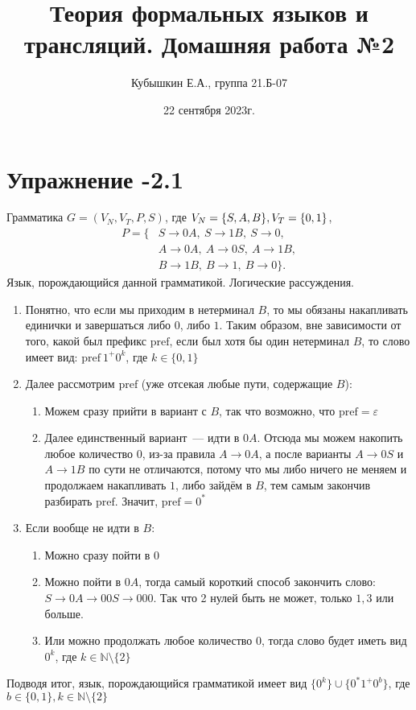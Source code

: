 \documentclass[12pt, a4paper, oneside]{memoir}
\title{Теория формальных языков и трансляций. Домашняя работа №2}
\author{Кубышкин Е.А., группа 21.Б-07}
\date{22 сентября 2023г.}
\begin{document}
\maketitle

\section*{Упражнение -2.1}
\begin{solution}
    {Грамматика $G = (V_N, V_T, P, S)$, где $V_N = \{S, A, B\}, \\ V_T = \{0, 1\}$,
        \begin{align*}
            P = \{
             & S \to 0A, \   S \to 1B, \   S \to 0,    \\
             & A \to 0A,\    A \to 0S,\    A \to 1B,   \\
             & B\to 1B, \    B\to 1,   \    B\to 0 \}.
        \end{align*}
    }
    {Язык, порождающийся данной грамматикой.}
    {Логические рассуждения.}
    \begin{enumerate}
        \item Понятно, что если мы приходим в нетерминал $B$, то мы обязаны накапливать единички и завершаться либо $0$, либо $1$. Таким образом, вне зависимости от того, какой был префикс $\mathrm{pref}$, если был хотя бы один нетерминал $B$, то слово имеет вид: $\mathrm{pref}\ 1^+ 0^k$, где $k \in \{0, 1\}$
        \item Далее рассмотрим $\mathrm{pref}$ (уже отсекая любые пути, содержащие $B$):
              \begin{enumerate}
                  \item Можем сразу прийти в вариант с $B$, так что возможно, что $\mathrm{pref} = \varepsilon$
                  \item Далее единственный вариант~--- идти в $0A$. Отсюда мы можем накопить любое количество $0$, из-за правила $A\to 0A$, а после варианты $A \to 0S$ и $A\to 1B$ по сути не отличаются, потому что мы либо ничего не меняем и продолжаем накапливать $1$, либо зайдём в $B$, тем самым закончив разбирать $\mathrm{pref}$. Значит, $\mathrm{pref} = 0^*$
              \end{enumerate}
        \item Если вообще не идти в $B$:
              \begin{enumerate}
                  \item Можно сразу пойти в $0$
                  \item Можно пойти в $0A$, тогда самый короткий способ закончить слово: $S \to 0A \to 00S \to 000$. Так что 2 нулей быть не может, только $1, 3$ или больше.
                  \item Или можно продолжать любое количество $0$, тогда слово будет иметь вид $0^k$, где $k \in \mathbb{N} \setminus \{2\}$
              \end{enumerate}
    \end{enumerate}
    Подводя итог, язык, порождающийся грамматикой имеет вид
    $\{0^k\} \cup \{0^*1^+0^b\}$, где $b \in \{0,1\}, k\in \mathbb{N} \setminus \{2\}$
\end{solution}
\end{document}
